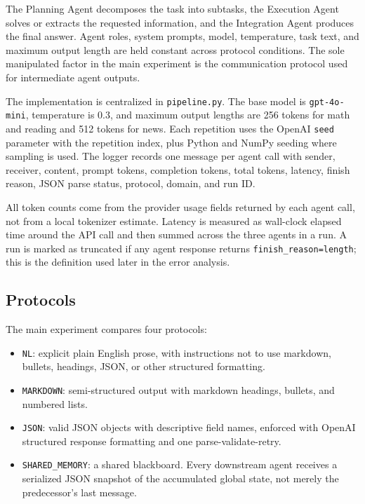 \documentclass[11pt]{article}
\newcommand{\NL}{\texttt{NL}\xspace}
\newcommand{\MD}{\texttt{MARKDOWN}\xspace}
\newcommand{\JS}{\texttt{JSON}\xspace}
\newcommand{\SM}{\texttt{SHARED\_MEMORY}\xspace}
\begin{document}
The Planning Agent decomposes the task into subtasks, the Execution Agent solves or extracts the requested information, and the Integration Agent produces the final answer. Agent roles, system prompts, model, temperature, task text, and maximum output length are held constant across protocol conditions. The sole manipulated factor in the main experiment is the communication protocol used for intermediate agent outputs.

The implementation is centralized in \texttt{pipeline.py}. The base model is \texttt{gpt-4o-mini}, temperature is 0.3, and maximum output lengths are 256 tokens for math and reading and 512 tokens for news. Each repetition uses the OpenAI \texttt{seed} parameter with the repetition index, plus Python and NumPy seeding where sampling is used. The logger records one message per agent call with sender, receiver, content, prompt tokens, completion tokens, total tokens, latency, finish reason, JSON parse status, protocol, domain, and run ID.

All token counts come from the provider usage fields returned by each agent call, not from a local tokenizer estimate. Latency is measured as wall-clock elapsed time around the API call and then summed across the three agents in a run. A run is marked as truncated if any agent response returns \texttt{finish\_reason=length}; this is the definition used later in the error analysis.

\subsection{Protocols}

The main experiment compares four protocols:

\begin{itemize}
  \item \NL: explicit plain English prose, with instructions not to use markdown, bullets, headings, JSON, or other structured formatting.
  \item \MD: semi-structured output with markdown headings, bullets, and numbered lists.
  \item \JS: valid JSON objects with descriptive field names, enforced with OpenAI structured response formatting and one parse-validate-retry.
  \item \SM: a shared blackboard. Every downstream agent receives a serialized JSON snapshot of the accumulated global state, not merely the predecessor's last message.
\end{itemize}
\end{document}
